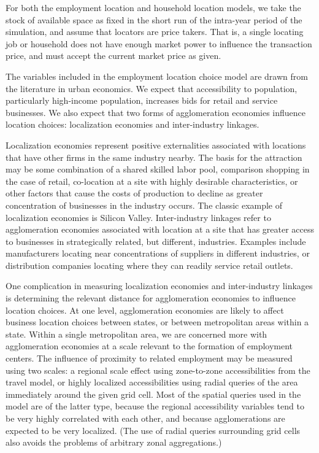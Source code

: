 \documentclass[fleqn]{article}
\begin{document}
For both the employment location and household location models, we
take the stock of available space as fixed in the short run of the
intra-year period of the simulation, and assume that locators are
price takers.  That is, a single locating job or household does
not have enough market power to influence the transaction price,
and must accept the current market price as given.

The variables included in the employment location choice model are
drawn from the literature in urban economics.  We expect that
accessibility to population, particularly high-income population,
increases bids for retail and service businesses.  We also expect
that two forms of agglomeration economies influence location
choices: localization economies and inter-industry linkages.

Localization economies represent positive externalities associated
with locations that have other firms in the same industry nearby.
The basis for the attraction may be some combination of a shared
skilled labor pool, comparison shopping in the case of retail,
co-location at a site with highly desirable characteristics, or
other factors that cause the costs of production to decline as
greater concentration of businesses in the industry occurs.  The
classic example of localization economies is Silicon Valley.
Inter-industry linkages refer to agglomeration economies
associated with location at a site that has greater access to
businesses in strategically related, but different, industries.
Examples include manufacturers locating near concentrations of
suppliers in different industries, or distribution companies
locating where they can readily service retail outlets.

One complication in measuring localization economies and
inter-industry linkages is determining the relevant distance for
agglomeration economies to influence location choices.  At one
level, agglomeration economies are likely to affect business
location choices between states, or between metropolitan areas
within a state.  Within a single metropolitan area, we are
concerned more with agglomeration economies at a scale relevant to
the formation of employment centers.  The influence of proximity
to related employment may be measured using two scales: a regional
scale effect using zone-to-zone accessibilities from the travel
model, or highly localized accessibilities using radial queries of the
area immediately around the given grid cell.  Most of the spatial
queries used in the model are of the latter type, because the
regional accessibility variables tend to be very highly
correlated with each other, and because agglomerations are expected
to be very localized.  (The use of radial queries surrounding grid
cells also avoids the problems of arbitrary zonal aggregations.)
\end{document}
